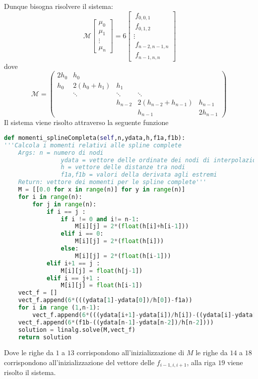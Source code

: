 \documentclass[a4paper,12pt]{report}
\theoremstyle{definition}
\begin{document}
Dunque bisogna risolvere il sistema:\\
\begin{displaymath}
\ \mathcal{M}
\left[ \begin{array}{ccc}
\mu_{0} \\
\mu_{1} \\
\vdots \\
\mu_{n}
\end{array} \right] = 6
\left[ \begin{array}{ccc}
\ f_{0,0,1} \\
\ f_{0,1,2} \\
\vdots \\
\ f_{n-2,n-1,n} \\
\ f_{n-1,n,n}
\end{array} \right]
\end{displaymath}
dove 
\[\mathcal{M} = \left( \begin{array}{ccccc}
2 h_0 & h_0 & & & \\
h_0 & 2(h_0+h_1) & h_1 & & \\
& \ddots & \ddots & \ddots &  \\
& &  h_{n-2} & 2(h_{n-2} + h_{n-1}) & h_{n-1}  \\
& & & h_{n-1} & 2h_{n-1} \end{array} \right) \]
Il sistema viene risolto attraverso la seguente funzione\\
\begin{lstlisting}[language=Python]
def momenti_splineCompleta(self,n,ydata,h,f1a,f1b):
'''Calcola i momenti relativi alle spline complete
	Args: n = numero di nodi
				ydata = vettore delle ordinate dei nodi di interpolazione
				h = vettore delle distanze tra nodi
				f1a,f1b = valori della derivata agli estremi
	Return: vettore dei momenti per le spline complete'''
	M = [[0.0 for x in range(n)] for y in range(n)] 
	for i in range(n): 
		for j in range(n): 
			if i == j :
				if i != 0 and i!= n-1:
					M[i][j] = 2*(float(h[i]+h[i-1]))
				elif i == 0:
					M[i][j] = 2*(float(h[i]))
				else:
					M[i][j] = 2*(float(h[i-1]))
			elif i+1 == j :
				M[i][j] = float(h[j-1])
			elif i == j+1 :
				M[i][j] = float(h[i-1])
	vect_f = []
	vect_f.append(6*(((ydata[1]-ydata[0])/h[0])-f1a))
	for i in range (1,n-1):
		vect_f.append(6*(((ydata[i+1]-ydata[i])/h[i])-((ydata[i]-ydata[i-1])/h[i-1])))
	vect_f.append(6*(f1b-((ydata[n-1]-ydata[n-2])/h[n-2])))
	solution = linalg.solve(M,vect_f)
	return solution
\end{lstlisting}
Dove le righe da $1$ a $13$ corrispondono all'inizializzazione di $M$ le righe da $14$ a $18$ corrispondono all'inizializzazione del vettore delle $f_{i-1,i,i+1}$, alla riga $19$ viene risolto il sistema.\\
\end{document}
